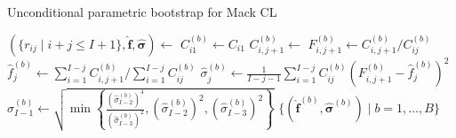 \documentclass[a4paper]{book}
\begin{document}
\begin{algorithm}[!htb]
  \caption{Unconditional parametric bootstrap for Mack CL} 
  \label{alg:uncond-param-mack}
  \begin{algorithmic} 
    \vspace{5pt}
    \State $(\{ r_{ij} \mid i + j \leq I + 1 \}, \bm{\widehat{f}}, \bm{\widehat{\sigma}}) \gets$  
    \vspace{5pt}
      \vspace{5pt}
        \vspace{5pt}
        \State $C^{(b)}_{i1} \gets C_{i1}$
        \vspace{5pt}
      \EndFor
      \vspace{5pt}
          \vspace{5pt}
          \State $C^{(b)}_{i, j + 1} \gets$ 
          \vspace{5pt}
          \State $\displaystyle F^{(b)}_{i, j + 1} \gets C^{(b)}_{i, j + 1} / C^{(b)}_{ij}$
          \vspace{5pt}
        \EndFor
        \vspace{5pt}
        \State $\widehat{f}^{(b)}_j \gets \sum_{i = 1}^{I - j} C^{(b)}_{i, j + 1} / \sum_{i = 1}^{I - j} C^{(b)}_{ij}$
        \vspace{5pt}
          \vspace{5pt}
          \State $\displaystyle \widehat{\sigma}^{(b)}_j \gets \frac{1}{I - j - 1}\sum_{i = 1}^{I - j} C^{(b)}_{ij} \left( F^{(b)}_{i, j + 1} - \widehat{f}^{(b)}_j \right)^2$
          \vspace{5pt}
        \Else
          \vspace{5pt}
          \State $\widehat{\sigma}^{(b)}_{I - 1} \gets \sqrt{\min{ \left \{ \displaystyle \frac{(\widehat{\sigma}^{(b)}_{I - 2})^4}{(\widehat{\sigma}^{(b)}_{I - 3})^2}, (\widehat{\sigma}^{(b)}_{I - 2})^2, (\widehat{\sigma}^{(b)}_{I - 3})^2 \right \} }}$
          \vspace{5pt}
          \EndIf
        \EndFor
    \EndFor    
    \State \Return $\{ (\widehat{\bm{f}}^{(b)}, \widehat{\bm{\sigma}}^{(b)}) \mid b = 1, \dots, B \}$
  \end{algorithmic}
\end{algorithm}
\end{document}
